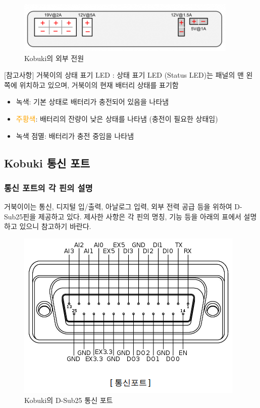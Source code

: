\begin{figure}[h]
\centering\includegraphics[width=0.6\columnwidth]{pictures/chapter10/kobuki_power.png}
\caption{Kobuki의 외부 전원}
\end{figure}

[참고사항] 
거북이의 상태 표기 LED
: 상태 표기 LED (Status LED)는 패널의 맨 왼쪽에 위치하고 있으며, 거북이의 현재 배터리 상태를 표기함
\begin{itemize}[leftmargin=*]
\item {\color{limegreen}녹색}: 기본 상태로 배터리가 충전되어 있음을 나타냄
\item \textcolor{orange}{주황색}: 배터리의 잔량이 낮은 상태를 나타냄 (충전이 필요한 상태임)
\item {\color{limegreen}녹색 점멸}: 배터리가 충전 중임을 나타냄
\end{itemize}

\subsection{Kobuki 통신 포트}

\subsubsection{통신 포트의 각 핀의 설명}
거북이이는 통신, 디지털  입/출력, 아날로그 입력, 외부 전력 공급 등을 위하여 D-Sub25핀을 제공하고 있다. 제사한 사항은 각 핀의 명칭, 기능 등을 아래의 표에서 설명하고 있으니 참고하기 바란다.

\begin{figure}[h]
\centering\includegraphics[width=0.5\columnwidth]{pictures/chapter10/kobuki_dsub25.png}
\caption{Kobuki의 D-Sub25 통신 포트}
\end{figure}

